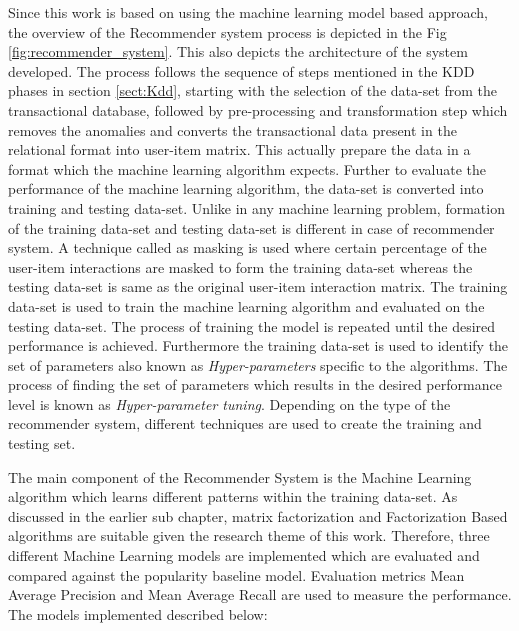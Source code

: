Since this work is based on using the machine learning model based approach, the overview of the Recommender system  process is depicted in the Fig \ref{fig:recommender_system}. This also depicts the architecture of the system developed. The process follows the sequence of steps mentioned in the KDD phases in section \ref{sect:Kdd}, starting with the selection of the data-set from the transactional database, followed by pre-processing and transformation step which removes the anomalies and converts the transactional data present in the relational format into user-item matrix. This actually prepare the data in a format which the machine learning algorithm expects. Further to evaluate the performance of the machine learning algorithm, the data-set is converted into training and testing data-set. Unlike in any machine learning problem, formation of the training data-set and testing data-set is different in case of recommender system. A technique called as masking is used where certain percentage of the user-item interactions are masked to form the training data-set whereas the testing data-set is same as the original user-item interaction matrix. The training data-set is used to train the machine learning algorithm and evaluated on the testing data-set. The process of training the model is repeated until the desired performance is achieved. Furthermore the training data-set is used to identify the set of parameters also known as \textit{Hyper-parameters} specific to the algorithms. The process of finding the set of parameters which results in the desired performance level is known as \textit{Hyper-parameter tuning}. Depending on the type of the recommender system, different techniques are used to create the training and testing set. 
\\
\par
The main component of the Recommender System is the Machine Learning algorithm which learns different patterns within the training data-set. As discussed in the earlier sub chapter, matrix factorization and Factorization Based algorithms are suitable given the research theme of this work. Therefore, three different Machine Learning models are implemented which are evaluated and compared against the popularity baseline model. Evaluation metrics Mean Average Precision and Mean Average Recall are used to measure the performance. The models implemented described below:

